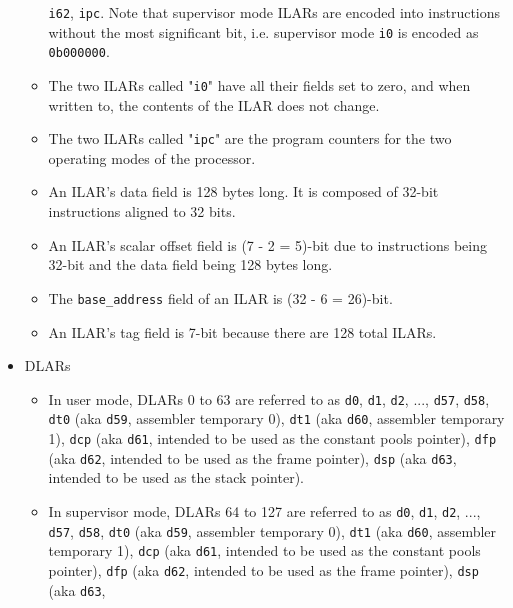 \documentclass{article}
\begin{document}
\begin{itemize}
\begin{itemize}
			\texttt{i62}, \texttt{ipc}. Note that supervisor mode ILARs are
			encoded into instructions without the most significant bit,
			i.e. supervisor mode \texttt{i0} is encoded as
			\texttt{0b000000}.
		\item The two ILARs called "\texttt{i0}" have all their
			fields set to zero, and when written to, the contents of the
			ILAR does not change.
		\item The two ILARs called "\texttt{ipc}" are the program counters
			for the two operating modes of the processor.
		\item An ILAR's data field is 128 bytes long. It is composed of
			32-bit instructions aligned to 32 bits.
		\item An ILAR's scalar offset field is (7 - 2 = 5)-bit due to
			instructions being 32-bit and the data field being 128 bytes
			long.
		\item The \texttt{base\_address} field of an ILAR is
			(32 - 6 = 26)-bit.
		\item An ILAR's tag field is 7-bit because there are 128 total
			ILARs.
		\end{itemize}
	\item DLARs
		\begin{itemize}
		\item In user mode, DLARs 0 to 63 are referred to as 
			\texttt{d0}, \texttt{d1}, \texttt{d2}, ..., \texttt{d57},
			\texttt{d58},
			\texttt{dt0} (aka \texttt{d59}, assembler temporary 0),
			\texttt{dt1} (aka \texttt{d60}, assembler temporary 1),
			\texttt{dcp} (aka \texttt{d61},
				intended to be used as the constant pools pointer),
			\texttt{dfp} (aka \texttt{d62},
				intended to be used as the frame pointer),
			\texttt{dsp} (aka \texttt{d63},
				intended to be used as the stack pointer).
		\item In supervisor mode, DLARs 64 to 127 are referred to as
			\texttt{d0}, \texttt{d1}, \texttt{d2}, ..., \texttt{d57},
			\texttt{d58},
			\texttt{dt0} (aka \texttt{d59}, assembler temporary 0),
			\texttt{dt1} (aka \texttt{d60}, assembler temporary 1),
			\texttt{dcp} (aka \texttt{d61},
				intended to be used as the constant pools pointer),
			\texttt{dfp} (aka \texttt{d62},
				intended to be used as the frame pointer),
			\texttt{dsp} (aka \texttt{d63},

\end{itemize}
\end{itemize}
\end{document}
